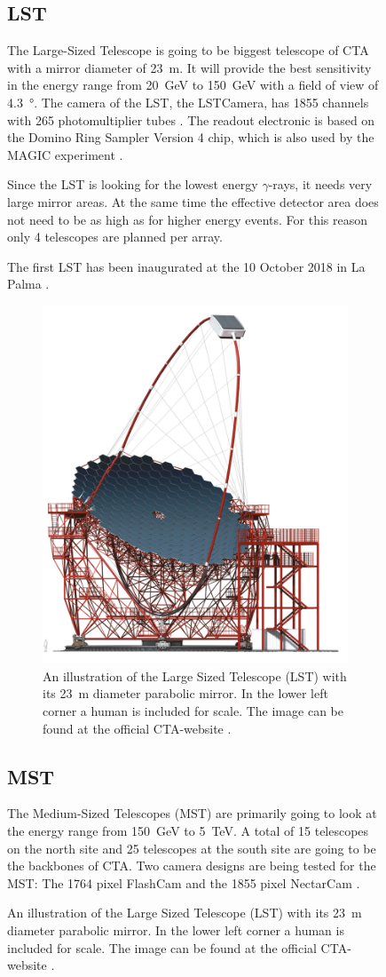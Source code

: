 \begin{figure}
\subsection{LST}
\label{sec:lst}

The Large-Sized Telescope is going to be biggest telescope of CTA
with a mirror diameter of \SI{23}{\meter}.
It will provide the best sensitivity in the energy range from 
\SI{20}{\giga\electronvolt} to \SI{150}{\giga\electronvolt} with a field of view of \SI{4.3}{\degree}.
The camera of the LST, the LSTCamera, has \num{1855} channels 
with \num{265} photomultiplier tubes \cite{cta_web}.
The readout electronic is based on the Domino Ring Sampler 
Version 4 chip, which is also used by the MAGIC experiment
\cite{Kubo:2013pwa}. 

Since the LST is looking for the lowest energy $\gamma$-rays, it needs
very large mirror areas. At the same time the effective detector area does 
not need to be as high as for higher energy events.
For this reason only 4 telescopes are planned per array.

The first LST has been inaugurated at the 10 October 2018 in La Palma \cite{lst_debut}.

\begin{figure}
	\center
	\captionsetup{width=0.9\linewidth}
	\includegraphics[width=.4\textwidth]{images/LST.png}
	\caption{
		An illustration of the Large Sized Telescope (LST) with its
		\SI{23}{\meter} diameter parabolic mirror.
		In the lower left corner a human is included for scale.
		The image can be found at the official CTA-website \cite{cta_web}.}
	\label{fig:lst}
\end{figure}

\subsection{MST}

The Medium-Sized Telescopes (MST) are primarily going to look at the 
energy range from \SI{150}{\giga\electronvolt} to \SI{5}{\tera\electronvolt}.
A total of 15 telescopes on the north site and 25 telescopes at the south site 
are going to be the backbones of CTA.
Two camera designs are being tested for the MST:
The 1764 pixel FlashCam and the 1855 pixel NectarCam \cite{cta_web}.


\end{figure}
